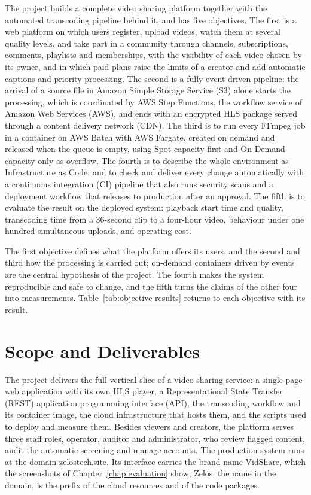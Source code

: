 The project builds a complete video sharing platform together with the automated transcoding
pipeline behind it, and has five objectives. The first is a web platform on which users register,
upload videos, watch them at several quality levels, and take part in a community through
channels, subscriptions, comments, playlists and memberships, with the visibility of each video
chosen by its owner, and in which paid plans raise the limits of a creator and add automatic
captions and priority processing. The second is a fully event-driven pipeline: the arrival of a source file in
Amazon Simple Storage Service (S3) alone starts the processing, which is coordinated by AWS Step Functions, the workflow service of Amazon Web Services (AWS), and ends with an
encrypted HLS package served through a content delivery network (CDN). The third is to run every FFmpeg
job in a container on AWS Batch with AWS Fargate, created on demand and released when the queue is
empty, using Spot capacity first and On-Demand capacity only as overflow. The fourth is to describe
the whole environment as Infrastructure as Code, and to check and deliver every change automatically
with a continuous integration (CI) pipeline that also runs security scans and a deployment workflow
that releases to production after an approval. The fifth is to evaluate the
result on the deployed system: playback start time and quality, transcoding time from a 36-second
clip to a four-hour video, behaviour under one hundred simultaneous uploads, and operating cost.

The first objective defines what the platform offers its users, and the second and third how the
processing is carried out; on-demand containers driven by events are the central hypothesis of the
project. The fourth makes the system reproducible and safe to change, and the fifth turns the
claims of the other four into measurements. Table~\ref{tab:objective-results} returns to each
objective with its result.

\section{Scope and Deliverables}
\label{sec:scope}

The project delivers the full vertical slice of a video sharing service: a single-page web
application with its own HLS player, a Representational State Transfer (REST) application programming interface (API), the transcoding workflow and its container image,
the cloud infrastructure that hosts them, and the scripts used to deploy and measure them. Besides
viewers and creators, the platform serves three staff roles, operator, auditor and administrator,
who review flagged content, audit the automatic screening and manage accounts. The production
system runs at the domain \href{https://zelostech.site}{zelostech.site}. Its interface carries the
brand name VidShare, which the screenshots of Chapter~\ref{chap:evaluation} show; Zelos, the name in
the domain, is the prefix of the cloud resources and of the code packages.

